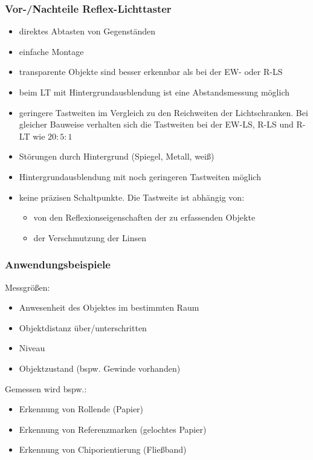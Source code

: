 \documentclass{scrreprt}
\begin{document}
\subsubsection*{Vor-/Nachteile Reflex-Lichttaster}
\begin{itemize}[label=$+$]
\item direktes Abtasten von Gegenständen
\item einfache Montage
\item transparente Objekte sind besser erkennbar als bei der EW- oder R-LS
\item beim LT mit Hintergrundausblendung ist eine Abstandsmessung möglich
\end{itemize}
\begin{itemize}[label=$-$]
\item geringere Tastweiten im Vergleich zu den Reichweiten der Lichtschranken. Bei gleicher Bauweise verhalten sich die Tastweiten bei der EW-LS, R-LS und R-LT wie $20:5:1$
\item Störungen durch Hintergrund (Spiegel, Metall, weiß)
\item Hintergrundausblendung mit noch geringeren Tastweiten möglich
\item keine präzisen Schaltpunkte. Die Tastweite ist abhängig von:
\begin{itemize}[label=\textbullet]
\item von den Reflexionseigenschaften der zu erfassenden Objekte
\item der Verschmutzung der Linsen
\end{itemize}
\end{itemize}

\subsubsection*{Anwendungsbeispiele}
Messgrößen:
\begin{itemize}
\item Anwesenheit des Objektes im bestimmten Raum
\item Objektdistanz über/unterschritten
\item Niveau
\item Objektzustand (bspw. Gewinde vorhanden)
\end{itemize}
Gemessen wird bspw.:
\begin{itemize}
\item Erkennung von Rollende (Papier)
\item Erkennung von Referenzmarken (gelochtes Papier)
\item Erkennung von Chiporientierung (Fließband)
\end{itemize}


\end{document}
